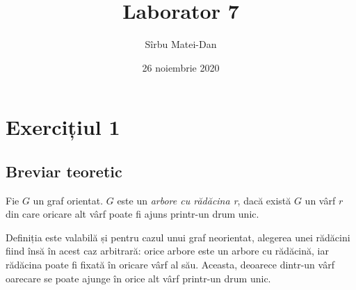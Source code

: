 \documentclass[9pt,a4paper]{article}
\title{\bf Laborator 7}
\author{Sîrbu Matei-Dan}
\date{26 noiembrie 2020}
\begin{document}
\maketitle

\section*{Exercițiul 1}
\subsection*{Breviar teoretic}

Fie $G$ un graf orientat. $G$ este un \textit{arbore cu rădăcina r}, dacă există $G$ un vârf $r$ din care oricare alt vârf poate fi ajuns printr-un drum unic.

Definiția este valabilă și pentru cazul unui graf neorientat, alegerea unei rădăcini fiind însă în acest caz arbitrară: orice arbore este un arbore cu rădăcină, iar rădăcina poate fi fixată în oricare vârf al său. Aceasta, deoarece dintr-un vârf oarecare se poate ajunge în orice alt vârf printr-un drum unic.
\end{document}
